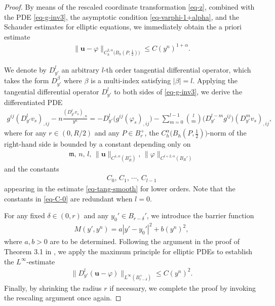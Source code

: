 \documentclass[11pt,reqno]{amsart}
\newcommand{\fm}{\mathfrak{m}}
\renewcommand{\leq}{\leqslant}
\theoremstyle{definition}
\numberwithin{equation}{section}
\begin{document}
\begin{proof}
    By means of the rescaled coordinate transformation \eqref{eq-z}, combined with the PDE \eqref{eq-g-inv3}, the asymptotic condition \eqref{eq-varphi-1+alpha}, and the Schauder estimates for elliptic equations, we immediately obtain the a priori estimate
    \begin{align}
          \|\mathbf{u} -\varphi\|_{C^{2, \alpha}_h\bigl(B_h(P, \tfrac{1}{2})\bigr)}\leq C (y^n)^{1+\alpha}.
    \end{align}

    We denote by $D_{y'}^l$ an arbitrary $l$-th order tangential differential operator, which takes the form $D_{y'}^\beta$ where $\beta$ is a multi-index satisfying $|\beta|=l$. Applying the tangential differential operator $D_{y'}^l$ to both sides of \eqref{eq-g-inv3}, we derive the differentiated PDE
    \begin{align}\label{eq-g-inv4}
         g^{ij}(D_{y'}^l v_s)_{,ij} - n  \frac{(D_{y'}^l v_s)_{,n}}{y^n} = - D_{y'}^l\bigl(g^{ij}(\varphi_{s})_{,ij}\bigr) -\sum_{m=0}^{l-1}\binom{l}{m} \bigl(D_{y'}^{l-m} g^{ij}\bigr)(D_{y'}^m v_s)_{,ij},
    \end{align}
    where for any $r\in (0, R/2)$ and any $P\in B_{r}^+$, the $C^\alpha_h\bigl(B_h(P,\frac{1}{2})\bigr)$-norm of the right-hand side is bounded by a constant depending only on
    \begin{align}
    \fm, \, n, \, l, \, \|\mathbf{u}\|_{C^{1,\alpha}(B^+_R)}, \, \|\varphi\|_{C^{l+2,\alpha}(B_R')}
    \end{align}
    and the constants
    \begin{align}\label{eq-C-0}
        C_0, \, C_1, \, \cdots, \, C_{l-1}
    \end{align}
    appearing in the estimate \eqref{eq-tang-smooth} for lower orders. Note that the constants in \eqref{eq-C-0} are redundant when $l=0$.

    For any fixed $\delta\in (0, r)$ and any $y_0' \in B_{r-\delta}'$, we introduce the barrier function
    \begin{align}
        M(y', y^n) = a|y'-y_0'|^2 + b(y^n)^2,
    \end{align}
    where $a,b>0$ are to be determined. Following the argument in the proof of Theorem 3.1 in \cite{HanJiang2023}, we apply the maximum principle for elliptic PDEs to establish the $L^\infty$-estimate
    \begin{align}
        \| D_{y'}^l (\mathbf{u} -\varphi) \|_{L^\infty(B^+_{r-\delta})}\leq C (y^n)^{2}.
    \end{align}
    Finally, by shrinking the radius $r$ if necessary, we complete the proof by invoking the rescaling argument once again.
\end{proof}
\end{document}
